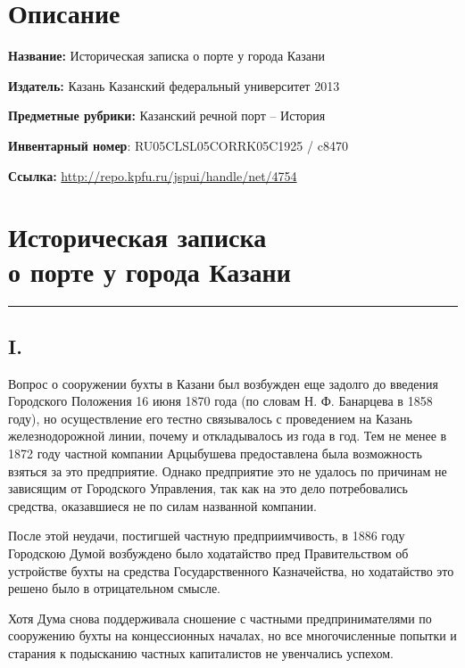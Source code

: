 \documentclass[oneside,final,14pt]{extreport}
\begin{document}
	
	\section*{Описание}
	
	{\bf Название:} Историческая записка о порте у города Казани
	
	{\bf Издатель:} Казань Казанский федеральный университет 2013
	
	{\bf Предметные рубрики:} Казанский речной порт -- История
	
	{\bf Инвентарный номер}: RU05CLSL05CORRK05C1925 / c8470
	
	{\bf Ссылка:} \hyperref[http://repo.kpfu.ru/jspui/handle/net/4754]{http://repo.kpfu.ru/jspui/handle/net/4754}
	
	{%
		\centering
		\section*{Историческая записка \\о порте у города Казани}
	}
	
	\begin{center}
		\noindent\rule{8cm}{0.4pt}
	\end{center}
	
	{%
		\centering
		\subsection*{I.}
	}
	
	Вопрос о сооружении бухты в Казани был возбужден еще задолго до введения Городского Положения 16 июня 1870 года (по словам Н. Ф. Банарцева в 1858 году), но осуществление его тестно связывалось с проведением на Казань железнодорожной линии, почему и откладывалось из года в год. Тем не менее в 1872 году частной компании Арцыбушева предоставлена была возможность взяться за это предприятие. Однако предприятие это не удалось по причинам не зависящим от Городского Управления, так как на это дело потребовались средства, оказавшиеся не по силам названной компании.
	
	После этой неудачи, постигшей частную предприимчивость, в 1886 году Городскою Думой возбуждено было ходатайство пред Правительством об устройстве бухты на средства Государственного Казначейства, но ходатайство это решено было в отрицательном смысле.
	
	Хотя Дума снова поддерживала сношение с частными предпринимателями по сооружению бухты на концессионных началах, но все многочисленные попытки и старания к подысканию частных капиталистов не увенчались успехом.
	
\end{document}
